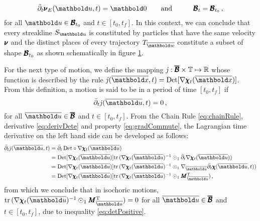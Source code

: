 \begin{alignat}{3} 
\tilde{\partial}_t\tnr{\nu}_E(\vto{u},t)=\vto{0} &\qquad \text{and}\qquad & \tnr{\mathcal{B}}_t= \tnr{\mathcal{B}}_{t_0}\,,
\end{alignat}
for all $\vto{u}\in\tnr{\mathcal{B}}_{t_0}$ and $t\in [t_0,t_f]$. In this context, we can conclude that every streakline $S_{\vto{u}}$ is constituted by particles that have the same velocity $\pmb{\nu}$ and the distinct places of every trajectory $T_{\overline{\vto{w}}}$ constitute a subset of shape $\pmb{\mathcal{B}}_{t_0}$ as shown schematically in figure \ref{fg:steady}.
\begin{figure}[!ht]
\centering
\begin{center}
\scalebox{.72}{}
\end{center}
\label{fg:steady}
\end{figure}

For the next type of motion, we define the mapping $\mathit{j} : \pmb{\overline{\mathcal{B}}}\times\mathbb{T} \mapsto \mathbb{R}$ whose function is described by the rule $\mathit{j}(\overline{\vto{x}},t)=\textnormal{Det}[\fua{\nabla\tnr{\chi}_t}{\overline{\vto{x}}}]$. From this definition, a motion is said to be  in a period of time $[t_0,t_f]$ if 
\begin{equation}\label{eq:isochoricMotion}
\bar{\partial}_t\mathit{j}(\overline{\vto{u}},t) = 0\,,
\end{equation}
for all $\overline{\vto{u}} \in \tnr{\overline{\mathcal{B}}}$ and $t\in[t_0,t_f]$. From the Chain Rule \eqref{eq:chainRule}, derivative \eqref{eq:derivDete} and property \eqref{eq:gradCommute}, the Lagrangian time derivative on the left hand side can be developed as follows:
\begin{align}
\bar{\partial}_t\mathit{j}(\overline{\vto{u}},t)&= \bar{\partial}_t\,\textnormal{Det}\circ\fua{\nabla\tnr{\chi}_t}{\overline{\vto{u}}}\nonumber\\
&=\textnormal{Det}[\fua{\nabla\tnr{\chi}_t}{\overline{\vto{u}}}]\trc{\fua{\nabla\tnr{\chi}_t}{\overline{\vto{u}}}^{-1}\odot_1\bar{\partial}_t\fua{\nabla\tnr{\chi}_t}{\overline{\vto{u}}}}\nonumber\\
&=\textnormal{Det}[\fua{\nabla\tnr{\chi}_t}{\overline{\vto{u}}}]\trc{\fua{\nabla\tnr{\chi}_t}{\overline{\vto{u}}}^{-1}\odot_1\fua{\nabla_{\overline{\vto{u}}}\bar{\partial}_t\tnr{\chi}}{\overline{\vto{u}},t}}\nonumber\\
&=\textnormal{Det}[\fua{\nabla\tnr{\chi}_t}{\overline{\vto{u}}}]\trc{\fua{\nabla\tnr{\chi}_t}{\overline{\vto{u}}}^{-1}\odot_1\tnr{M}_{\overline{\vto{u}}}^\text{T}}\,,
\end{align}
from which we conclude that in isochoric motions, $\trc{\fua{\nabla\tnr{\chi}_t}{\overline{\vto{u}}}^{-1}\odot_1\tnr{M}_{\overline{\vto{u}}}^\text{T}}=0$ for all $\overline{\vto{u}} \in \tnr{\overline{\mathcal{B}}}$ and $t\in[t_0,t_f]$, due to inequality \eqref{eq:detPositive}.

